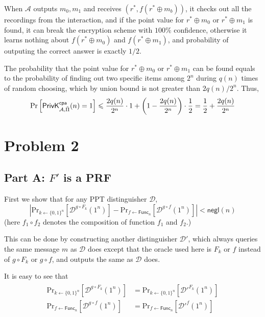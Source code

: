 \documentclass[8pt]{article}
\theoremstyle{compact}
\def\le{\leqslant}
\begin{document}
When $\mathcal A$ outputs $m_0, m_1$ and receives $(r^*, f(r^* \oplus m_b))$, it checks out all the recordings from the interaction, and if the point value for $r^* \oplus m_0$ or $r^* \oplus m_1$ is found, it can break the encryption scheme with $100\%$ confidence, otherwise it learns nothing about $f(r^* \oplus m_0)$ and $f(r^* \oplus m_1)$, and probability of outputing the correct answer is exactly $1/2$.

The probability that the point value for $r^* \oplus m_0$ or $r^* \oplus m_1$ can be found equals to the probability of finding out two specific items among $2^n$ during $q(n)$ times of random choosing, which by union bound is not greater than $2q(n) / 2^n$. Thus, $$\text{Pr}\left[\PrivK{\mathcal A, \tilde{\Pi}}{cpa}(n) = 1\right] \le \frac{2q(n)}{2^n} \cdot 1 + \left(1 - \frac{2q(n)}{2^n}\right) \cdot \frac12 = \frac12 + \frac{2q(n)}{2^n}$$


\section*{Problem 2}
\subsection*{Part A: $F'$ is a PRF}
First we show that for any PPT distinguisher $\mathcal D$, \begin{equation}
	\left| \text{Pr}_{k \gets \{0, 1\}^n}\left[\mathcal D^{g \circ F_k}(1^n)\right] - \text{Pr}_{f \gets \textsf{Func}_n}\left[\mathcal D^{g \circ f}(1^n)\right] \right| < \textsf{negl}(n)\label{2-A-1}
\end{equation}
(here $f_1 \circ f_2$ denotes the composition of function $f_1$ and $f_2$.)

This can be done by constructing another distinguisher $\mathcal D'$, which always queries the same message $m$ as $\mathcal D$ does except that the oracle used here is $F_k$ or $f$ instead of $g \circ F_k$ or $g \circ f$, and outputs the same as $\mathcal D$ does.

It is easy to see that \begin{align*}
	\begin{split}
		\text{Pr}_{k \gets \{0, 1\}^n}\left[\mathcal D^{g \circ F_k}(1^n)\right] &= \text{Pr}_{k \gets \{0, 1\}^n}\left[\mathcal D'^{F_k}(1^n)\right] \\
		\text{Pr}_{f \gets \textsf{Func}_n}\left[\mathcal D^{g \circ f}(1^n)\right] &= \text{Pr}_{f \gets \textsf{Func}_n}\left[\mathcal D'^{f}(1^n)\right] \\
	\end{split}
\end{align*}
\end{document}
